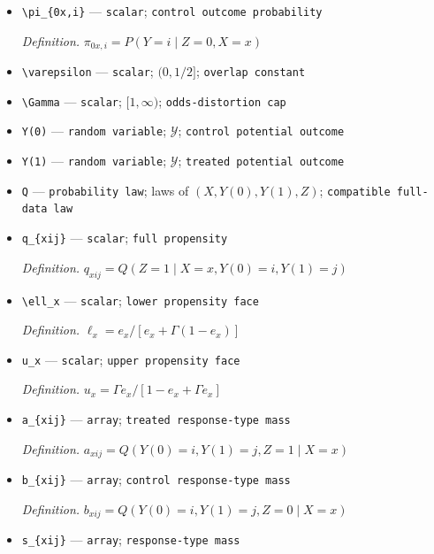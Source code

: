 \documentclass{article}
\begin{document}
\begin{itemize}
  \par\smallskip\noindent\emph{Definition.} \(\pi_{1x,j}=P(Y=j\mid Z=1,X=x)\)
  \item \texttt{\textbackslash{}\allowbreak{}pi\_\allowbreak{}\{0x,\allowbreak{}i\}\allowbreak{}} --- \texttt{scalar}; \texttt{control outcome probability}
  \par\smallskip\noindent\emph{Definition.} \(\pi_{0x,i}=P(Y=i\mid Z=0,X=x)\)
  \item \texttt{\textbackslash{}\allowbreak{}varepsilon} --- \texttt{scalar}; \((0,1/2]\); \texttt{overlap constant}
  \item \texttt{\textbackslash{}\allowbreak{}Gamma} --- \texttt{scalar}; \([1,\infty)\); \texttt{odds-\allowbreak{}distortion cap}
  \item \texttt{Y(0)} --- \texttt{random variable}; \(\mathcal Y\); \texttt{control potential outcome}
  \item \texttt{Y(1)} --- \texttt{random variable}; \(\mathcal Y\); \texttt{treated potential outcome}
  \item \texttt{Q} --- \texttt{probability law}; laws of \((X,Y(0),Y(1),Z)\); \texttt{compatible full-\allowbreak{}data law}
  \item \texttt{q\_\allowbreak{}\{xij\}\allowbreak{}} --- \texttt{scalar}; \texttt{full propensity}
  \par\smallskip\noindent\emph{Definition.} \(q_{xij}=Q(Z=1\mid X=x,Y(0)=i,Y(1)=j)\)
  \item \texttt{\textbackslash{}\allowbreak{}ell\_\allowbreak{}x} --- \texttt{scalar}; \texttt{lower propensity face}
  \par\smallskip\noindent\emph{Definition.} \(\ell_x=e_x/[e_x+\Gamma(1-e_x)]\)
  \item \texttt{u\_\allowbreak{}x} --- \texttt{scalar}; \texttt{upper propensity face}
  \par\smallskip\noindent\emph{Definition.} \(u_x=\Gamma e_x/[1-e_x+\Gamma e_x]\)
  \item \texttt{a\_\allowbreak{}\{xij\}\allowbreak{}} --- \texttt{array}; \texttt{treated response-\allowbreak{}type mass}
  \par\smallskip\noindent\emph{Definition.} \(a_{xij}=Q(Y(0)=i,Y(1)=j,Z=1\mid X=x)\)
  \item \texttt{b\_\allowbreak{}\{xij\}\allowbreak{}} --- \texttt{array}; \texttt{control response-\allowbreak{}type mass}
  \par\smallskip\noindent\emph{Definition.} \(b_{xij}=Q(Y(0)=i,Y(1)=j,Z=0\mid X=x)\)
  \item \texttt{s\_\allowbreak{}\{xij\}\allowbreak{}} --- \texttt{array}; \texttt{response-\allowbreak{}type mass}

\end{itemize}
\end{document}
